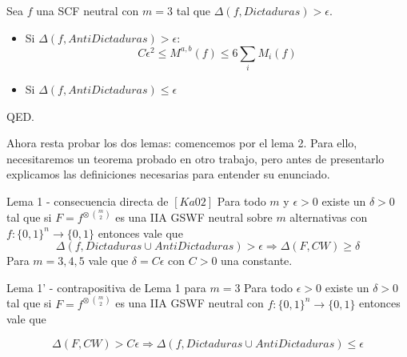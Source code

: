 \documentclass[compress]{beamer}
\begin{document}
\begin{frame}
Sea $f$ una SCF neutral con $m = 3$ tal que $\Delta(f, Dictaduras) > \epsilon$.

\begin{itemize}
\item Si $\Delta(f, AntiDictaduras) > \epsilon$: \\
$$ C\epsilon^2 \leq M^{a,b}(f) \leq 6 \sum_i M_i(f)$$ 
\item Si $\Delta(f, AntiDictaduras) \leq \epsilon$
\end{itemize}


QED.
\end{frame}

\begin{frame}
Ahora resta probar los dos lemas: comencemos por el lema 2. Para ello,
necesitaremos un teorema probado en otro trabajo, pero antes de presentarlo
explicamos las definiciones necesarias para entender su enunciado.



\end{frame}

\begin{frame}

\begin{block}{Lema 1 - consecuencia directa de $[Ka02]$}
Para todo $m$ y $\epsilon > 0$ existe un $\delta > 0$ tal que si 
$F = f^{\otimes \ \binom{m}{2}}$ es una IIA GSWF neutral sobre $m$
alternativas con $f : \{0,1\}^n \rightarrow \{0,1\}$ entonces vale que
$$\Delta(f, Dictaduras \cup AntiDictaduras) > \epsilon
\Rightarrow \Delta(F, CW) \geq \delta$$
\bigskip
Para $m=3,4,5$ vale que $\delta = C \epsilon$ con $C > 0$ una constante.
\end{block}

\begin{block}{Lema 1' - contrapositiva de Lema 1 para $m = 3$}
Para todo $\epsilon > 0$ existe un $\delta > 0$ tal que si 
$F = f^{\otimes \ \binom{m}{2}}$ es una IIA GSWF neutral con 
$f : \{0,1\}^n \rightarrow \{0,1\}$ entonces vale que

$$ \Delta(F, CW) > C \epsilon \Rightarrow \Delta(f, Dictaduras \cup AntiDictaduras) \leq \epsilon$$
\end{block}
\end{frame}
\end{document}
